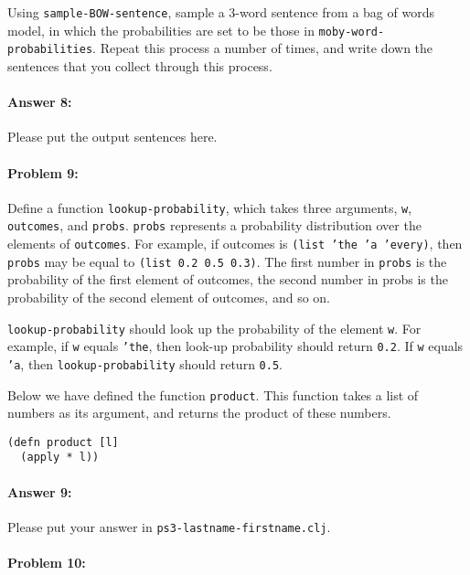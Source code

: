 \documentclass[10pt]{article}
\newcommand{\PSnum}{3}
\begin{document}
Using \texttt{sample-BOW-sentence}, sample a 3-word sentence from a
bag of words model, in which the probabilities are set to be those in
\texttt{moby-word-probabilities}. Repeat this process a number of
times, and write down the sentences that you collect through this
process.

\paragraph{Answer 8:} Please put the output sentences here.

\noindent\hrulefill %

\paragraph{Problem 9:}

Define a function \texttt{lookup-probability}, which takes three
arguments, \texttt{w}, \texttt{outcomes}, and
\texttt{probs}. \texttt{probs} represents a probability distribution
over the elements of \texttt{outcomes}. For example, if outcomes is
\texttt{(list 'the 'a 'every)}, then \texttt{probs} may be equal to
\texttt{(list 0.2 0.5 0.3)}. The first number in \texttt{probs} is the
probability of the first element of outcomes, the second number in
probs is the probability of the second element of outcomes, and so on.

\texttt{lookup-probability} should look up the probability of the
element \texttt{w}. For example, if \texttt{w} equals \texttt{'the},
then look-up probability should return \texttt{0.2}. If \texttt{w}
equals \texttt{'a}, then \texttt{lookup-probability} should return
\texttt{0.5}.

Below we have defined the function \texttt{product}. This function takes a list
of numbers as its argument, and returns the product of these numbers.

\begin{lstlisting}
(defn product [l]
  (apply * l))
\end{lstlisting}

\paragraph{Answer 9:} Please put your answer in
\texttt{ps\PSnum-lastname-firstname.clj}.

\noindent\hrulefill %

\paragraph{Problem 10:}
\end{document}
